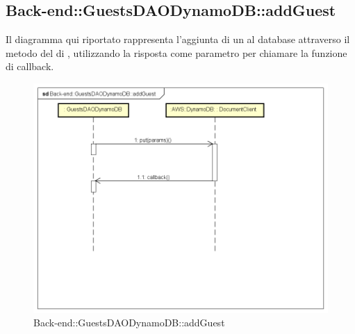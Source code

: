 \subsection{Back-end::GuestsDAODynamoDB::addGuest}
Il diagramma qui riportato rappresenta l'aggiunta di un  al database attraverso il metodo  del  di , utilizzando la risposta come parametro per chiamare la funzione di callback.
\begin{figure}[h] \centering \includegraphics[width=\textwidth,height=\textheight,keepaspectratio]{images/diagrams/back-end/Ufficial_Backend/Back-endGuestsDAODynamoDBaddGuest.png} 	\caption{Back-end::GuestsDAODynamoDB::addGuest}
\end{figure}
\newpage

